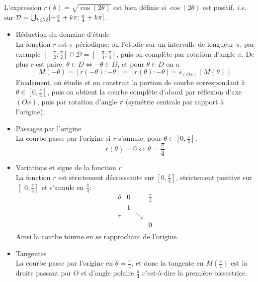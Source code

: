{\begin{enumerate}
{\begin{center}
\end{center}
L'expression $r(\theta)=\sqrt{\cos(2\theta)}$ est bien définie si $\cos(2\theta)$ est positif, \textsl{i.e.} sur $\mathcal{D}=\bigcup_{k\in\Z}[-\frac{\pi}{4}+k\pi;\frac{\pi}{4}+k\pi]$.
\begin{itemize}
\item Réduction du domaine d'étude\\
La fonction $r$ est $\pi$-périodique: on l'étudie sur un intervalle de longueur $\pi$, par exemple $[-\frac{\pi}{2};\frac{\pi}{2}]\cap\mathcal{D}=[-\frac{\pi}{4};\frac{\pi}{4}]$, puis on complète par rotation d'angle $\pi$. De plus $r$ est paire: $\theta\in D\Leftrightarrow-\theta\in D$, et pour $\theta\in D$ on a
$$M(-\theta)=\left[r(-\theta):-\theta\right]=\left[r(\theta):-\theta\right]=s_{(Ox)}(M(\theta))$$
Finalement, on étudie et on construit la portion de courbe correspondant à $\theta\in[0,\frac{\pi}{4}]$, puis on obtient la courbe complète d'abord par réflexion d'axe $(Ox)$, puis par rotation d'angle $\pi$ (symétrie centrale par rapport à l'origine).
\item Passages par l'origine\\
La courbe passe par l'origine si $r$ s'annule: pour $\theta\in[0,\frac{\pi}{4}]$,
$$r(\theta)=0\Longleftrightarrow\theta=\frac{\pi}{4}$$
\item Variations et signe de la fonction $r$\\
La fonction $r$ est strictement décroissante sur $[0,\frac{\pi}{4}]$, strictement positive sur $\left]0,\frac{\pi}{4}\right]$ et s'annule en $\frac{\pi}{4}$:
$$\begin{array}{c|lcr}
\theta&0&\ &\frac{\pi}{4}\\\hline
\ &1 &\ & \\
r&\ &\searrow &\ \\
 & &\ &0 \\
\end{array}$$
Ainsi la courbe tourne en se rapprochant de l'origine.
\item Tangentes\\
La courbe passe par l'origine en $\theta=\frac{\pi}{4}$, et donc la tangente en $M\left(\frac{\pi}{4}\right)$ est la droite passant par $O$ et d'angle polaire $\frac{\pi}{4}$ c'est-à-dire la première bissectrice. 


\end{itemize}}
\end{enumerate}}
